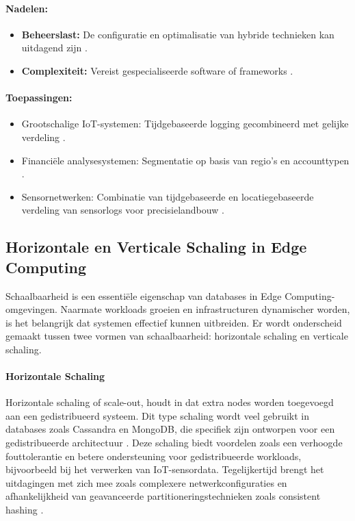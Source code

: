 \paragraph{Nadelen:}
\begin{itemize}
    \item \textbf{Beheerslast:} De configuratie en optimalisatie van hybride technieken kan uitdagend zijn \autocite{Ponnusamy2024}.
    \item \textbf{Complexiteit:} Vereist gespecialiseerde software of frameworks \autocite{Taheri2020}.
\end{itemize}

\paragraph{Toepassingen:}
\begin{itemize}
    \item Grootschalige IoT-systemen: Tijdgebaseerde logging gecombineerd met gelijke verdeling \autocite{Shi2016}.
    \item Financiële analysesystemen: Segmentatie op basis van regio's en accounttypen \autocite{Ponnusamy2024}.
    \item Sensornetwerken: Combinatie van tijdgebaseerde en locatiegebaseerde verdeling van sensorlogs voor precisielandbouw \autocite{Taheri2020}.
\end{itemize}

\subsection{Horizontale en Verticale Schaling in Edge Computing}

Schaalbaarheid is een essentiële eigenschap van databases in Edge Computing-omgevingen. Naarmate workloads groeien en infrastructuren dynamischer worden, is het belangrijk dat systemen effectief kunnen uitbreiden. Er wordt onderscheid gemaakt tussen twee vormen van schaalbaarheid: horizontale schaling en verticale schaling.

\paragraph{Horizontale Schaling}
Horizontale schaling of scale-out, houdt in dat extra nodes worden toegevoegd aan een gedistribueerd systeem. Dit type schaling wordt veel gebruikt in databases zoals Cassandra en MongoDB, die specifiek zijn ontworpen voor een gedistribueerde architectuur \autocite{Kleppmann2017}.  
Deze schaling biedt voordelen zoals een verhoogde fouttolerantie en betere ondersteuning voor gedistribueerde workloads, bijvoorbeeld bij het verwerken van IoT-sensordata. 
Tegelijkertijd brengt het uitdagingen met zich mee zoals complexere netwerkconfiguraties en afhankelijkheid van geavanceerde partitioneringstechnieken zoals consistent hashing \autocite{Mahmud2020}.

